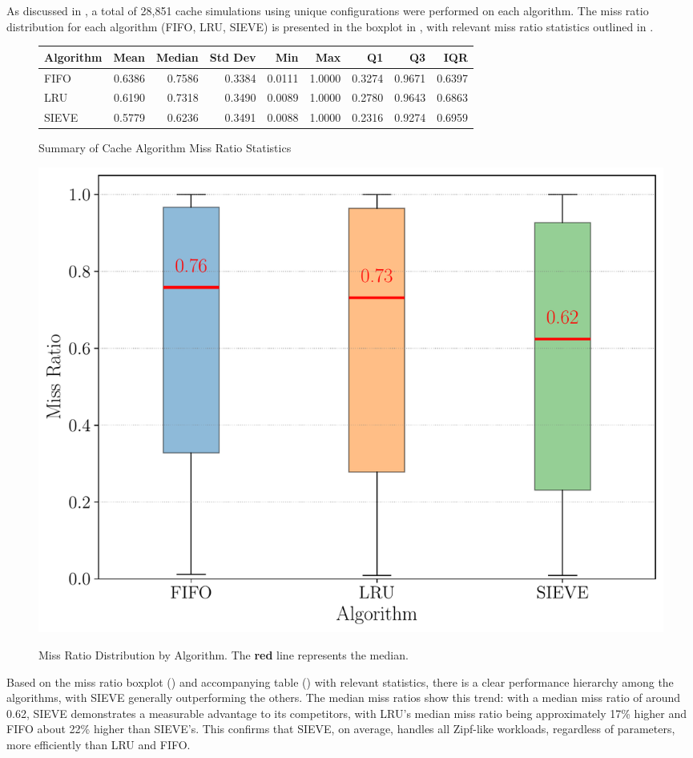 
As discussed in , a total of 28,851 cache simulations using unique configurations were performed on each algorithm. The miss ratio distribution for each algorithm (FIFO, LRU, SIEVE) is presented in the boxplot in , with relevant miss ratio statistics outlined in .

\begin{figure}[h!]
    \centering
    \caption{Summary of Cache Algorithm Miss Ratio Statistics}
    \label{tab: miss_ratio_stats}
    \begin{tabular}{l r r r r r r r r}
        \toprule
        \textbf{Algorithm} & \textbf{Mean} & \textbf{Median} & \textbf{Std Dev} & \textbf{Min} & \textbf{Max} & \textbf{Q1} & \textbf{Q3} & \textbf{IQR} \\
        \midrule
        FIFO & 0.6386 & 0.7586 & 0.3384 & 0.0111 & 1.0000 & 0.3274 & 0.9671 & 0.6397 \\
        LRU & 0.6190 & 0.7318 & 0.3490 & 0.0089 & 1.0000 & 0.2780 & 0.9643 & 0.6863 \\
        SIEVE & 0.5779 & 0.6236 & 0.3491 & 0.0088 & 1.0000 & 0.2316 & 0.9274 & 0.6959 \\
        \bottomrule
    \end{tabular}
\end{figure}


\begin{figure}[h!]
    \centering
    \caption{Miss Ratio Distribution by Algorithm. The {\color{red}\textbf{red}} line represents the median.}
    \includegraphics[width=0.6\linewidth]{figures/simulations/miss_ratio_distribution_no_title.pdf}
    \label{fig:miss-ratio-distribution}
\end{figure}

Based on the miss ratio boxplot () and accompanying table () with relevant statistics, there is a clear performance hierarchy among the algorithms, with SIEVE generally outperforming the others. The median miss ratios show this trend: with a median miss ratio of around 0.62, SIEVE demonstrates a measurable advantage to its competitors, with LRU's median miss ratio being approximately 17\% higher and FIFO about 22\% higher than SIEVE's. This confirms that SIEVE, on average, handles all Zipf-like workloads, regardless of parameters, more efficiently than LRU and FIFO.

